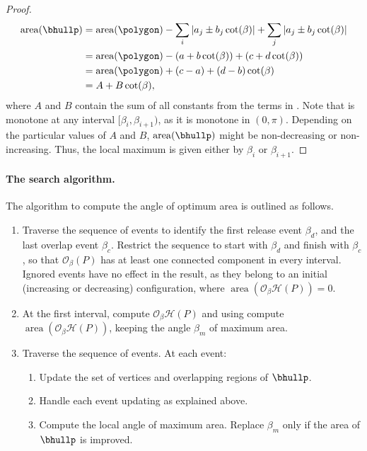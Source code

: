 \documentclass[11pt,letterpaper,english]{article}
\theoremstyle{definition}
\newcommand{\area}{\operatorname{area}}
\begin{document}
\begin{proof}
  \begin{align}
    \label{apps:area:eqn:event_2}
    \area(\bhullp) &= \area(\polygon)
                     - \sum_i |a_j \pm b_j \cot(\beta)|
                     + \sum_j |a_j \pm b_j \cot(\beta)| \\
                   &= \area(\polygon)
                     - \left( a + b\cot(\beta) \right)
                     + \left( c + d\cot(\beta) \right) \nonumber \\
                   &= \area(\polygon)
                     + (c-a) +(d-b)\cot(\beta) \nonumber \\
    \label{apps:area:eqn:event_3}
                   &= A + B\cot(\beta),
  \end{align}
  where $A$ and $B$ contain the sum of all constants from the terms in
  . Note that 
  is monotone at any interval $[\beta_i,\beta_{i+1})$, as it is
  monotone in $(0,\pi)$. Depending on the particular values of $A$ and
  $B$, $\area(\bhullp)$ might be non-decreasing or
  non-increasing. Thus, the local maximum is given either by $\beta_i$
  or $\beta_{i+1}$.
\end{proof}

\paragraph{The search algorithm.}

The algorithm to compute the angle of optimum area is outlined as
follows.
\begin{enumerate}
\item \label{apps:area:step_1}Traverse the sequence of events to
  identify the first release event $\beta_d$, and the last
  overlap event $\beta_c$.
  Restrict the sequence to start with $\beta_d$ and finish with $\beta_c$, so that $\mathcal{O}_{\beta}(P)$ has at least one connected component in every interval. Ignored events have no effect in the
  result, as they belong to an initial (increasing or decreasing) configuration, where $\operatorname{area}(\mathcal{O}_\beta\mathcal{H}(P))=0$.
\item \label{apps:area:step_2} At the first interval, compute
$\mathcal{O}_\beta\mathcal{H}(P)$ and using  compute
$\operatorname{area}(\mathcal{O}_\beta\mathcal{H}(P))$, keeping the angle
$\beta_m$ of maximum area.
\item \label{apps:area:step_3}Traverse the sequence of events. At each
  event:
  \begin{enumerate}
  \item \label{apps:area:step_3_1}Update the set of vertices and
    overlapping regions of $\bhullp$.
  \item \label{apps:area:step_3_2}Handle each event updating
     as explained above.
  \item \label{apps:area:step_3_3}Compute the local angle of maximum
    area. Replace $\beta_m$ only if the area of $\bhullp$ is improved.
  \end{enumerate}
\end{enumerate}
\end{document}

